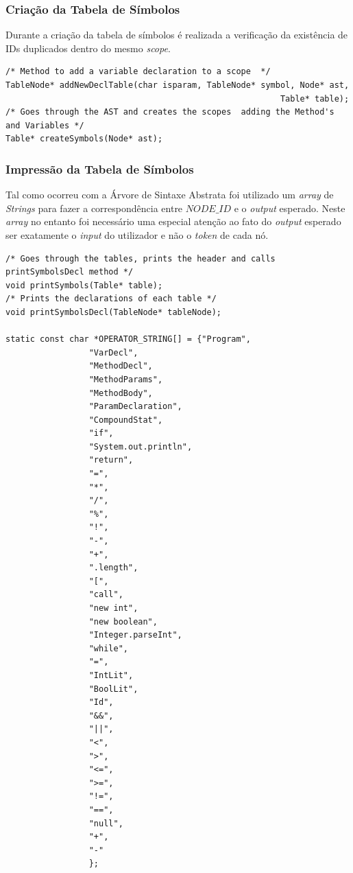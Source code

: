 \documentclass[12pt]{article}
\begin{document}
\subsubsection{Criação da Tabela de Símbolos}

Durante a criação da tabela de símbolos é realizada a verificação da existência de IDs duplicados dentro do mesmo \emph{scope}.

\begin{lstlisting}
/* Method to add a variable declaration to a scope  */
TableNode* addNewDeclTable(char isparam, TableNode* symbol, Node* ast,
												    	Table* table);
/* Goes through the AST and creates the scopes  adding the Method's and Variables */												    	
Table* createSymbols(Node* ast);
\end{lstlisting}

\subsubsection{Impressão da Tabela de Símbolos}
Tal como ocorreu com a Árvore de Sintaxe Abstrata foi utilizado um \emph{array} de \emph{Strings} para fazer a correspondência entre $NODE\_ID$ e o \emph{output} esperado. Neste \emph{array} no entanto foi necessário uma especial atenção ao fato do \emph{output} esperado ser exatamente o \emph{input} do utilizador e não o \emph{token} de cada nó.

\begin{lstlisting}
/* Goes through the tables, prints the header and calls printSymbolsDecl method */
void printSymbols(Table* table);
/* Prints the declarations of each table */
void printSymbolsDecl(TableNode* tableNode);

static const char *OPERATOR_STRING[] = {"Program",
                 "VarDecl",
                 "MethodDecl",
                 "MethodParams",
                 "MethodBody",
                 "ParamDeclaration",
                 "CompoundStat",
                 "if",
                 "System.out.println",
                 "return",
                 "=",
                 "*",
                 "/",
                 "%",
                 "!",
                 "-",
                 "+",
                 ".length",
                 "[",
                 "call",
                 "new int",
                 "new boolean",
                 "Integer.parseInt",
                 "while",
                 "=",
                 "IntLit",
                 "BoolLit",
                 "Id",
                 "&&",
                 "||",
                 "<",
                 ">",
                 "<=",
                 ">=",
                 "!=",
                 "==",
                 "null",
                 "+",
                 "-"
                 };

\end{lstlisting}
\end{document}
